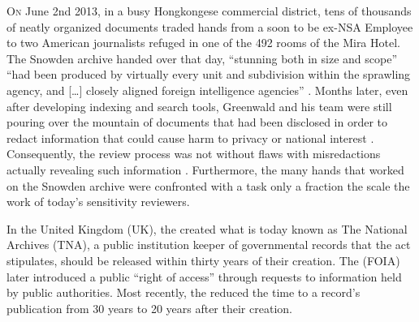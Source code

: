 \documentclass[\version]{l4proj}
\begin{document}
\lettrine[lines=3,nindent=0em]{O}{n} June 2nd 2013, in a busy Hongkongese commercial district, tens of thousands of neatly organized documents traded hands from a soon to be ex-NSA Employee to two American journalists refuged in one of the 492 rooms of the Mira Hotel.
The Snowden archive handed over that day, ``stunning both in size and scope'' ``had been produced by virtually every unit and subdivision within the sprawling agency, and [\ldots] closely aligned foreign intelligence agencies'' \autocite[77]{greenwaldNoPlaceHide2014}.
Months later, even after developing indexing and search tools, Greenwald and his team were still pouring over the mountain of documents that had been disclosed in order to redact information that could cause harm to privacy or national interest \autocite{greenwaldFactsHowNSA2014}.
Consequently, the review process was not without flaws with misredactions actually revealing such information \autocite{oliverGovernmentSurveillanceLast2015}.
Furthermore, the many hands that worked on the Snowden archive were confronted with a task only a fraction the scale the work of today's sensitivity reviewers.

In the United Kingdom (UK), the \textcite{PublicRecordsAct1958} created what is today known as The National Archives (TNA), a public institution keeper of governmental records that the act stipulates, should be released within thirty years of their creation.
The \textcite{FreedomInformationAct2000} (FOIA) later introduced a public ``right of access'' through requests to information held by public authorities.
Most recently, the \textcite{ConstitutionalReformGovernance2010} reduced the time to a record's publication from 30 years to 20 years after their creation.
\end{document}
